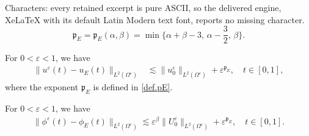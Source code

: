 \documentclass[10pt,a4paper]{amsart}
\newcommand{\eps}{\varepsilon}
\begin{document}
Characters: every retained excerpt is pure ASCII, so the delivered engine, XeLaTeX with its default Latin Modern text font, reports no missing character.
\begin{equation}\label{def.pE}
    \mathfrak p_E 
    = \mathfrak p_E(\alpha,\beta)
    = \min\Big\{\alpha+\beta-3,\, \alpha-\frac{3}{2},\, \beta\Big\}.
\end{equation}

\begin{proposition}\label{prop.RoC.E}
For $0<\eps<1$, we have 
\begin{equation}\label{est1.prop.RoC.E}
    \begin{split}
    \|u^\eps(t)-u_E(t)\|_{L^2(\Omega^\eps)}
    &\lesssim
    \|u^\eps_0\|_{L^2(\Omega^\eps)} 
    + \eps^{\mathfrak p_E},
    \quad
    t\in [0,1], 
    \end{split}
\end{equation}
where the exponent $\mathfrak p_E$ is defined in \eqref{def.pE}.
\end{proposition}

\begin{lemma}\label{lem.RoC.phiE}
For  $0<\eps<1$, we have
\begin{equation}\label{est1.lem.RoC.phiE}
\begin{split}
    \|\phi^\eps(t) - \phi_E(t)\|_{L^2(\Omega^\eps)}
    \lesssim
    \eps^\beta \|U^\eps_0\|_{L^2(\Omega^\eps)} + \eps^{\mathfrak p_E},
    \quad
    t\in [0,1]. 
\end{split}
\end{equation}
\end{lemma}
\end{document}
